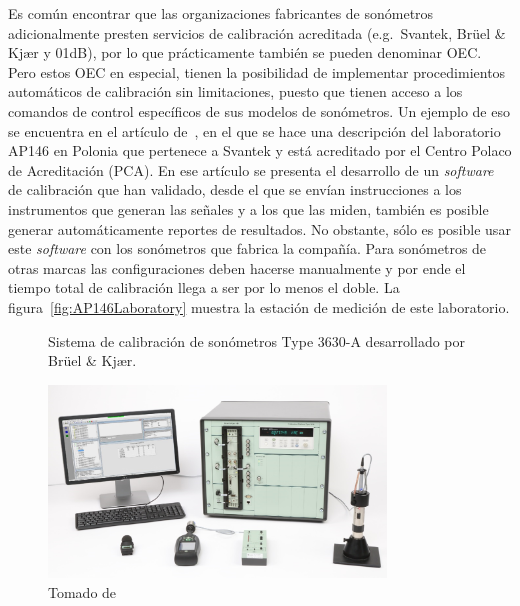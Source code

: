 Es común encontrar que las organizaciones fabricantes de sonómetros adicionalmente presten servicios de calibración
acreditada (e.g.\ Svantek, Brüel \& Kjær y 01dB), por lo que prácticamente también se pueden denominar OEC\@.
Pero estos OEC en especial, tienen la posibilidad de implementar procedimientos automáticos de calibración sin
limitaciones, puesto que tienen acceso a los comandos de control específicos de sus modelos de sonómetros.
Un ejemplo de eso se encuentra en el artículo de~\cite{Podgorski2016}, en el que se hace una descripción del laboratorio
AP146 en Polonia que pertenece a Svantek y está acreditado por el Centro Polaco de Acreditación (PCA).
En ese artículo se presenta el desarrollo de un \emph{software} de calibración que han validado, desde el que se envían
instrucciones a los instrumentos que generan las señales y a los que las miden, también es posible generar
automáticamente reportes de resultados.
No obstante, sólo es posible usar este \emph{software} con los sonómetros que fabrica la compañía.
Para sonómetros de otras marcas las configuraciones deben hacerse manualmente y por ende el tiempo total de calibración
llega a ser por lo menos el doble.
La figura~\ref{fig:AP146Laboratory} muestra la estación de medición de este laboratorio.

\begin{figure}[!h]
    \caption{Sistema de calibración de sonómetros Type 3630-A desarrollado por Brüel \& Kjær.}
    \label{fig:BK3630A}
    \centering
    \includegraphics[width=0.8\textwidth]{1_Intro/BK3630A}
    \caption*{\footnotesize Tomado de~\cite{BruelKjaer2000}}
\end{figure}

